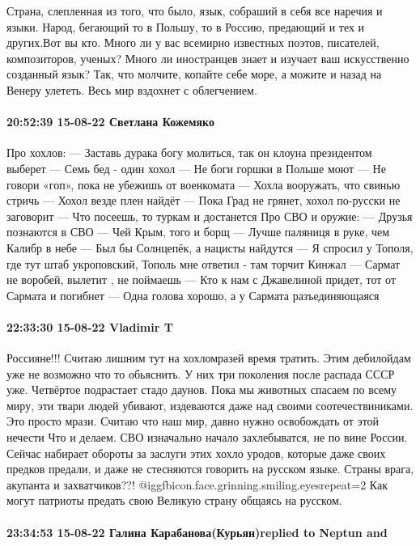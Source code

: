 Страна, слепленная из того, что было, язык, собраший в себя все наречия и
языки. Народ, бегающий то в Польшу, то в Россию, предающий и тех и других.Вот
вы кто. Много ли у вас всемирно известных поэтов, писателей, композиторов,
ученых? Много ли иностранцев знает и изучает ваш искусственно созданный язык?
Так, что молчите, копайте себе море, а можите и назад на Венеру улететь. Весь
мир вздохнет с облегчением.

\paragraph{20:52:39 15-08-22 Светлана Кожемяко}

\obeycr
Про хохлов:
— Заставь дурака богу молиться, так он клоуна президентом выберет
— Семь бед - один хохол
— Не боги горшки в Польше моют
— Не говори «гоп», пока не убежишь от военкомата
— Хохла вооружать, что свинью стричь
— Хохол везде плен найдёт
— Пока Град не грянет, хохол по-русски не заговорит
— Что посеешь, то туркам и достанется
Про СВО и оружие:
— Друзья познаются в СВО
— Чей Крым, того и борщ
— Лучше паляниця в руке, чем Калибр в небе
— Был бы Солнцепёк, а нацисты найдутся
— Я спросил у Тополя, где тут штаб укроповский, Тополь мне ответил - там торчит Кинжал
— Сармат не воробей, вылетит , не поймаешь
— Кто к нам с Джавелиной придет, тот от Сармата и погибнет
— Одна голова хорошо, а у Сармата разъединяющаяся
\restorecr

\paragraph{22:33:30 15-08-22 Vladimir T}

\obeycr
Россияне!!!
Считаю лишним тут на хохломразей время тратить. Этим дебилойдам уже не возможно что то обьяснить.
У них три поколения после распада СССР уже. Четвёртое подрастает стадо даунов.
Пока мы животных спасаем по всему миру, эти твари людей убивают, издеваются даже над своими соотечествиниками. Это просто мрази.
Считаю что наш мир, давно нужно освобождать от этой нечести
Что и делаем.
СВО изначально начало захлебыватся, не по вине России.
Сейчас набирает обороты за заслуги этих хохло уродов, которые даже своих предков предали, и даже не стесняются говорить на русском языке. Страны врага, акупанта и захватчиков??!  @igg{fbicon.face.grinning.smiling.eyes}{repeat=2} 
Как могут патриоты предать свою Великую страну общаясь на русском.
\restorecr

\paragraph{23:34:53 15-08-22 Галина Карабанова(Курьян)replied to Neptun and}

